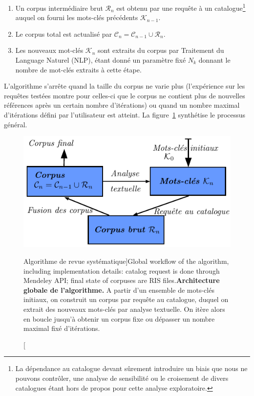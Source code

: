 {\begin{enumerate}
\item Un corpus intermédiaire brut $\mathcal{R}_n$ est obtenu par une requête à un catalogue\footnote{La dépendance au catalogue devant sûrement introduire un biais que nous ne pouvons contrôler, une analyse de sensibilité ou le croisement de divers catalogues étant hors de propos pour cette analyse exploratoire.}
 auquel on fourni les mots-clés précédents $\mathcal{K}_{n-1}$.
\item Le corpus total est actualisé par $\mathcal{C}_n = \mathcal{C}_{n-1} \cup \mathcal{R}_n$.
\item Les nouveaux mot-clés $\mathcal{K}_n$ sont extraits du corpus par Traitement du Language Naturel (NLP), étant donné un paramètre fixé $N_k$ donnant le nombre de mot-clés extraits à cette étape.
\end{enumerate}

L'algorithme s'arrête quand la taille du corpus ne varie plus (l'expérience sur les requêtes testées montre pour celles-ci que le corpus ne contient plus de nouvelles références après un certain nombre d'itérations) ou quand un nombre maximal d'itérations défini par l'utilisateur est atteint. La figure~\ref{fig:quantepistemo:algo} synthétise le processus général.
}


\begin{figure}
\centering
\includegraphics[width=0.8\linewidth]{Figures/QuantEpistemo/schema_algo}
\caption[Systematic review algorithm workflow][Algorithme de revue systématique]{Global workflow of the algorithm, including implementation details: catalog request is done through Mendeley API; final state of corpuses are RIS files.\label{fig:quantepistemo:algo}}{\textbf{Architecture globale de l'algorithme.} A partir d'un ensemble de mots-clés initiaux, on construit un corpus par requête au catalogue, duquel on extrait des nouveaux mots-clés par analyse textuelle. On itère alors en boucle jusqu'à obtenir un corpus fixe ou dépasser un nombre maximal fixé d'itérations.\label{fig:quantepistemo:algo}}
\end{figure}



